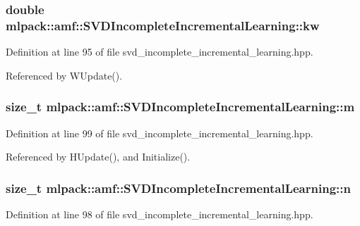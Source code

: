 \subsubsection[{kw}]{\setlength{\rightskip}{0pt plus 5cm}double mlpack\-::amf\-::\-S\-V\-D\-Incomplete\-Incremental\-Learning\-::kw\hspace{0.3cm}{\ttfamily [private]}}\label{classmlpack_1_1amf_1_1SVDIncompleteIncrementalLearning_a78d9b969ba33ebe917282ca0984fcf96}


Definition at line 95 of file svd\-\_\-incomplete\-\_\-incremental\-\_\-learning.\-hpp.



Referenced by W\-Update().

\subsubsection[{m}]{\setlength{\rightskip}{0pt plus 5cm}size\-\_\-t mlpack\-::amf\-::\-S\-V\-D\-Incomplete\-Incremental\-Learning\-::m\hspace{0.3cm}{\ttfamily [private]}}\label{classmlpack_1_1amf_1_1SVDIncompleteIncrementalLearning_ac302b1783ab31072f9cd7b4f5e726741}


Definition at line 99 of file svd\-\_\-incomplete\-\_\-incremental\-\_\-learning.\-hpp.



Referenced by H\-Update(), and Initialize().

\subsubsection[{n}]{\setlength{\rightskip}{0pt plus 5cm}size\-\_\-t mlpack\-::amf\-::\-S\-V\-D\-Incomplete\-Incremental\-Learning\-::n\hspace{0.3cm}{\ttfamily [private]}}\label{classmlpack_1_1amf_1_1SVDIncompleteIncrementalLearning_a253bf56378da5cde9d5bd9938a20f664}


Definition at line 98 of file svd\-\_\-incomplete\-\_\-incremental\-\_\-learning.\-hpp.



